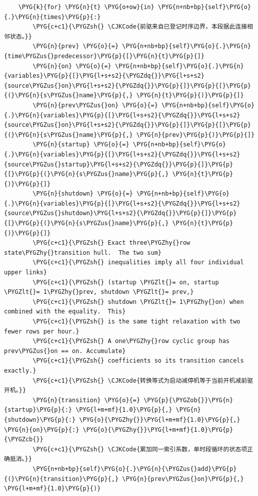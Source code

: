 \begin{Verbatim}
    \PYG{k}{for} \PYG{n}{t} \PYG{o+ow}{in} \PYG{n+nb+bp}{self}\PYG{o}{.}\PYG{n}{times}\PYG{p}{:}
        \PYG{c+c1}{\PYGZsh{} \CJKCode{前驱来自已登记时序边界，本段据此连接相邻状态。}}
        \PYG{n}{prev} \PYG{o}{=} \PYG{n+nb+bp}{self}\PYG{o}{.}\PYG{n}{time\PYGZus{}predecessor}\PYG{p}{[}\PYG{n}{t}\PYG{p}{]}
        \PYG{n}{on} \PYG{o}{=} \PYG{n+nb+bp}{self}\PYG{o}{.}\PYG{n}{variables}\PYG{p}{[}\PYG{l+s+s2}{\PYGZdq{}}\PYG{l+s+s2}{source\PYGZus{}on}\PYG{l+s+s2}{\PYGZdq{}}\PYG{p}{]}\PYG{p}{[}\PYG{p}{(}\PYG{n}{s\PYGZus{}name}\PYG{p}{,} \PYG{n}{t}\PYG{p}{)}\PYG{p}{]}
        \PYG{n}{prev\PYGZus{}on} \PYG{o}{=} \PYG{n+nb+bp}{self}\PYG{o}{.}\PYG{n}{variables}\PYG{p}{[}\PYG{l+s+s2}{\PYGZdq{}}\PYG{l+s+s2}{source\PYGZus{}on}\PYG{l+s+s2}{\PYGZdq{}}\PYG{p}{]}\PYG{p}{[}\PYG{p}{(}\PYG{n}{s\PYGZus{}name}\PYG{p}{,} \PYG{n}{prev}\PYG{p}{)}\PYG{p}{]}
        \PYG{n}{startup} \PYG{o}{=} \PYG{n+nb+bp}{self}\PYG{o}{.}\PYG{n}{variables}\PYG{p}{[}\PYG{l+s+s2}{\PYGZdq{}}\PYG{l+s+s2}{source\PYGZus{}startup}\PYG{l+s+s2}{\PYGZdq{}}\PYG{p}{]}\PYG{p}{[}\PYG{p}{(}\PYG{n}{s\PYGZus{}name}\PYG{p}{,} \PYG{n}{t}\PYG{p}{)}\PYG{p}{]}
        \PYG{n}{shutdown} \PYG{o}{=} \PYG{n+nb+bp}{self}\PYG{o}{.}\PYG{n}{variables}\PYG{p}{[}\PYG{l+s+s2}{\PYGZdq{}}\PYG{l+s+s2}{source\PYGZus{}shutdown}\PYG{l+s+s2}{\PYGZdq{}}\PYG{p}{]}\PYG{p}{[}\PYG{p}{(}\PYG{n}{s\PYGZus{}name}\PYG{p}{,} \PYG{n}{t}\PYG{p}{)}\PYG{p}{]}
        \PYG{c+c1}{\PYGZsh{} Exact three\PYGZhy{}row state\PYGZhy{}transition hull.  The two sum}
        \PYG{c+c1}{\PYGZsh{} inequalities imply all four individual upper links}
        \PYG{c+c1}{\PYGZsh{} (startup \PYGZlt{}= on, startup \PYGZlt{}= 1\PYGZhy{}prev, shutdown \PYGZlt{}= prev,}
        \PYG{c+c1}{\PYGZsh{} shutdown \PYGZlt{}= 1\PYGZhy{}on) when combined with the equality.  This}
        \PYG{c+c1}{\PYGZsh{} is the same tight relaxation with two fewer rows per hour.}
        \PYG{c+c1}{\PYGZsh{} A one\PYGZhy{}row cyclic group has prev\PYGZus{}on == on. Accumulate}
        \PYG{c+c1}{\PYGZsh{} coefficients so its transition cancels exactly.}
        \PYG{c+c1}{\PYGZsh{} \CJKCode{转换等式为启动减停机等于当前开机减前驱开机。}}
        \PYG{n}{transition} \PYG{o}{=} \PYG{p}{\PYGZob{}}\PYG{n}{startup}\PYG{p}{:} \PYG{l+m+mf}{1.0}\PYG{p}{,} \PYG{n}{shutdown}\PYG{p}{:} \PYG{o}{\PYGZhy{}}\PYG{l+m+mf}{1.0}\PYG{p}{,} \PYG{n}{on}\PYG{p}{:} \PYG{o}{\PYGZhy{}}\PYG{l+m+mf}{1.0}\PYG{p}{\PYGZcb{}}
        \PYG{c+c1}{\PYGZsh{} \CJKCode{累加同一索引系数，单时段循环的状态项正确抵消。}}
        \PYG{n+nb+bp}{self}\PYG{o}{.}\PYG{n}{\PYGZus{}add}\PYG{p}{(}\PYG{n}{transition}\PYG{p}{,} \PYG{n}{prev\PYGZus{}on}\PYG{p}{,} \PYG{l+m+mf}{1.0}\PYG{p}{)}

\end{Verbatim}
